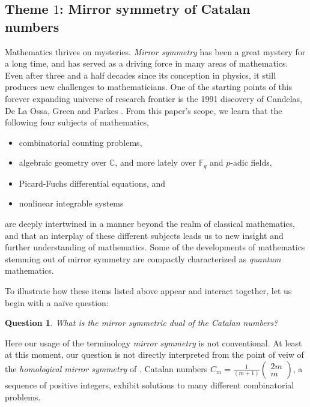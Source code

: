 \documentclass{amsart}
\newtheorem{quest}[thm]{Question}
\theoremstyle{definition}
\numberwithin{equation}{section}
\numberwithin{figure}{section}
\newcommand{\bC}{{\mathbb{C}}}
\newcommand{\bF}{{\mathbb{F}}}
\begin{document}
\subsection{Theme $1$: Mirror symmetry of Catalan numbers}
\label{subsect:Catalan}



Mathematics thrives on mysteries. \emph{Mirror symmetry}
has been a great mystery for a long time,
and has served as a driving force in many areas of
mathematics. Even after three and a half decades
since its conception in physics,
it still produces new challenges to mathematicians.
One of the  starting points of this forever expanding universe of 
research frontier is
the 1991 discovery of Candelas, De La Ossa, Green and Parkes
\cite{CdlOGP}. From this paper's scope, we
learn  that the following four subjects of mathematics,
\begin{itemize}
\item combinatorial counting problems,
\item  algebraic geometry over $\bC$, and more lately over  $\bF_q$
and $p$-adic fields,
\item Picard-Fuchs  differential 
equations, and
\item nonlinear integrable systems
\end{itemize}
are deeply intertwined in a manner beyond the realm of 
classical mathematics, and that an interplay of these different subjects
 leads us to new
insight and further understanding of mathematics. Some of the developments of
mathematics stemming out of mirror symmetry are compactly 
characterized as \emph{quantum} mathematics.


To illustrate how these  items listed above appear and interact together, 
let us begin  with a na\"ive question: 
\begin{quest}
What is the mirror symmetric dual of the Catalan  numbers?
\end{quest}
\noindent
Here our usage of the terminology 
\emph{mirror symmetry} is not conventional.
 At least at this moment, our question  
is not directly interpreted from the point of veiw of the
\emph{homological mirror symmetry} of \cite{K1994}.
Catalan numbers $C_m = \frac{1}{(m+1)} \begin{pmatrix}2m\\m
\end{pmatrix}$, a sequence of positive integers, 
exhibit  solutions to many different combinatorial problems. 
\end{document}
